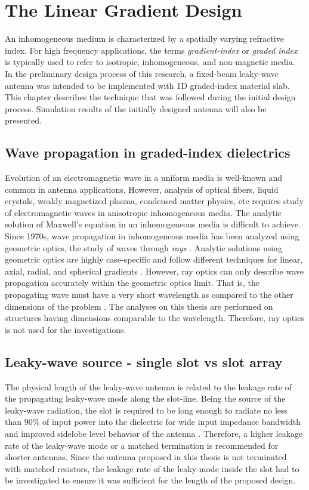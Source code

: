 

\chapter{The Linear Gradient Design} %
\label{Chapter5}

An inhomogeneous medium is characterized by a spatially varying refractive index. For high frequency applications, the terms \textit{gradient-index} or \textit{graded index} is typically used to refer to isotropic, inhomogeneous, and non-magnetic media. In the preliminary design process of this research, a fixed-beam leaky-wave antenna was intended to be implemented with 1D graded-index material slab. This chapter describes the technique that was followed during the initial design process. Simulation results of the initially designed antenna will also be presented.


\section{Wave propagation in graded-index dielectrics}
Evolution of an electromagnetic wave in a uniform media is well-known and common in antenna applications. However, analysis of optical fibers, liquid crystals, weakly magnetized plasma, condensed matter physics, etc requires study of electromagnetic waves in anisotropic inhomogeneous media. The analytic solution of Maxwell's equation in an inhomogeneous media is difficult to achieve. Since 1970s, wave propagation in inhomogeneous media has been analyzed using geometric optics, the study of waves through \textit{rays} \cite{Smithgall1973, Marcuse1973, Bliokh2007} \cite{Marcuse1973}. Analytic solutions using geometric optics are highly case-specific and follow different techniques for linear, axial, radial, and spherical gradients \cite{merchand2012} \cite{Melorose2015}.  However, ray optics can only describe wave propagation accurately within the geometric optics limit. That is, the propagating wave must have a very short wavelength as compared to the other dimensions of the problem \cite{nieto1991}. The analyses on this thesis are performed on structures having dimensions comparable to the wavelength. Therefore, ray optics is not used for the investigations. 

\section{Leaky-wave source - single slot vs slot array} 
The physical length of the leaky-wave antenna is related to the leakage rate of the propagating leaky-wave mode along the slot-line. Being the source of the leaky-wave radiation, the slot is required to be long enough to radiate no less than $90\%$ of input power into the dielectric for wide input impedance bandwidth and improved sidelobe level behavior of the antenna \cite{Jackson2008}. Therefore, a higher  leakage  rate  of  the leaky-wave  mode or a matched termination is recommended for shorter antennas. Since the antenna proposed in this thesis is not terminated with matched resistors, the leakage rate of the leaky-mode inside the slot had to be investigated to ensure it was sufficient for the length of the proposed design.

